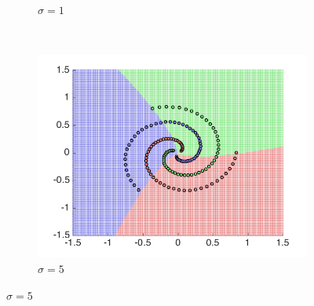 \documentclass[10pt,twocolumn,letterpaper]{article}
\begin{document}
\begin{figure}
\begin{subfigure}[H]{0.3 \columnwidth}
	\caption{$\sigma = 1$}
\end{subfigure}
~
\begin{subfigure}[H]{0.3 \columnwidth}
	\includegraphics[width = 1\columnwidth]{q2_ovr_sig5}
	\caption{$\sigma = 5$}
\end{subfigure}


\end{figure}
\end{document}
